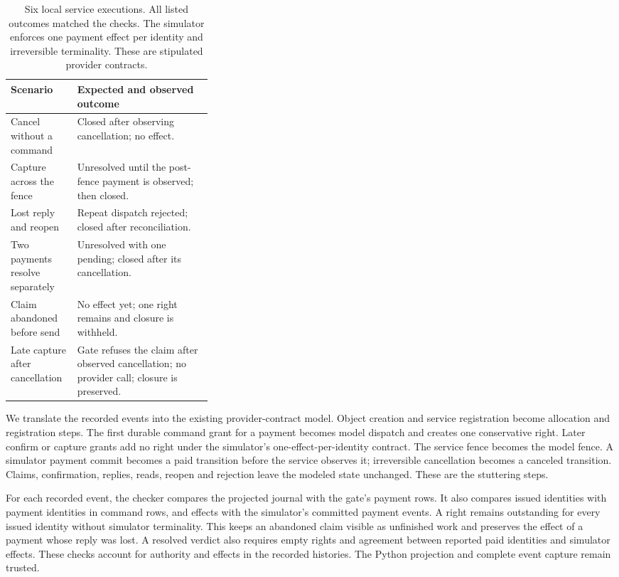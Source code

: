 \documentclass[11pt]{article}
\begin{document}
\begin{table}[ht]
\centering
\begin{tabularx}{\linewidth}{@{}p{0.33\linewidth} X@{}}
\toprule
Scenario & Expected and observed outcome \\
\midrule
Cancel without a command & Closed after observing cancellation; no effect. \\
Capture across the fence & Unresolved until the post-fence payment is observed; then closed. \\
Lost reply and reopen & Repeat dispatch rejected; closed after reconciliation. \\
Two payments resolve separately & Unresolved with one pending; closed after its cancellation. \\
Claim abandoned before send & No effect yet; one right remains and closure is withheld. \\
Late capture after cancellation & Gate refuses the claim after observed cancellation; no provider call; closure is preserved. \\
\bottomrule
\end{tabularx}
\caption{Six local service executions. All listed outcomes matched the checks.
The simulator enforces one payment effect per identity and irreversible
terminality. These are stipulated provider contracts.}
\label{tab:service_traces}
\end{table}

We translate the recorded events into the existing provider-contract model.
Object creation and service registration become allocation and registration
steps. The first durable command grant for a payment becomes model dispatch
and creates one conservative right. Later confirm or capture grants add no
right under the simulator's one-effect-per-identity contract. The service fence
becomes the model fence. A simulator payment commit becomes a paid transition
before the service observes it; irreversible cancellation becomes a canceled
transition. Claims, confirmation, replies, reads, reopen and rejection leave
the modeled state unchanged. These are the stuttering steps.

For each recorded event, the checker compares the projected journal with the
gate's payment rows. It also compares issued identities with payment identities
in command rows, and effects with the simulator's committed payment events.
A right remains outstanding for every issued identity without simulator
terminality. This keeps an abandoned claim visible as unfinished work and
preserves the effect of a payment whose reply was lost. A resolved verdict
also requires empty rights and agreement between reported paid identities and
simulator effects. These checks account for authority and effects in the
recorded histories. The Python projection and complete event capture remain
trusted.
\end{document}
